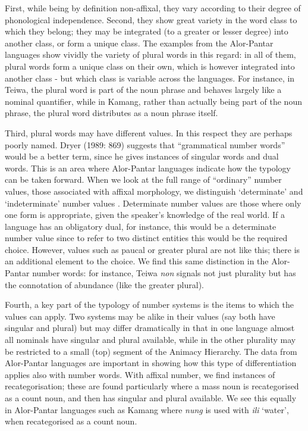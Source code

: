  First, while being by definition non-affixal, they vary according to their degree of phonological independence. Second, they show great variety in the word class to which they belong; they may be integrated (to a greater or lesser degree) into another class, or form a unique class. The examples from the Alor-Pantar languages show vividly the variety of plural words in this regard: in all of them, plural words form a unique class on their own, which is however integrated into another class - but which class is variable across the languages. For instance, in Teiwa, the plural word is part of the noun phrase and behaves largely like a nominal quantifier, while in Kamang, rather than actually being part of the noun phrase, the plural word distributes as a noun phrase itself.

 Third, plural words may have different values. In this respect they are perhaps poorly named. Dryer (1989: 869) suggests that ``grammatical number words'' would be a better term, since he gives instances of singular words and dual words. This is an area where Alor-Pantar languages indicate how the typology can be taken forward. When we look at the full range of ``ordinary'' number values, those associated with affixal morphology, we distinguish `determinate' and `indeterminate' number values \citep[39-41]{Corbett2000}. Determinate number values are those where only one form is appropriate, given the speaker's knowledge of the real world. If a language has an obligatory dual, for instance, this would be a determinate number value since to refer to two distinct entities this would be the required choice. However, values such as paucal or greater plural are not like this; there is an additional element to the choice. We find this same distinction in the Alor-Pantar number words: for instance, Teiwa \textit{non
}signals not just plurality but has the connotation of abundance (like the greater plural).

 Fourth, a key part of the typology of number systems is the items to which the values can apply. Two systems may be alike in their values (say both have singular and plural) but may differ dramatically in that in one language almost all nominals have singular and plural available, while in the other plurality may be restricted to a small (top) segment of the Animacy Hierarchy. The data from Alor-Pantar languages are important in showing how this type of differentiation applies also with number words. With affixal number, we find instances of recategorisation; these are found particularly where a mass noun is recategorised as a count noun, and then has singular and plural available. We see this equally in Alor-Pantar languages such as Kamang where \textit{nung} is used with \textit{ili} `water', when recategorised as a count noun.

